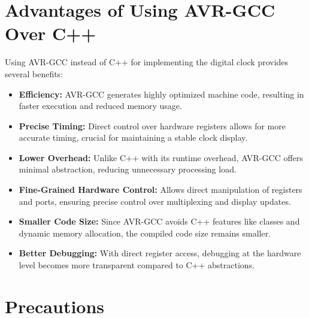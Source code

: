 \documentclass[a4paper,12pt]{article}
\theoremstyle{remark}
\begin{document}
 

\section{Advantages of Using AVR-GCC Over C++}
Using AVR-GCC instead of C++ for implementing the digital clock provides several benefits:

\begin{itemize}
    \item \textbf{Efficiency:} AVR-GCC generates highly optimized machine code, resulting in faster execution and reduced memory usage.
    \item \textbf{Precise Timing:} Direct control over hardware registers allows for more accurate timing, crucial for maintaining a stable clock display.
    \item \textbf{Lower Overhead:} Unlike C++ with its runtime overhead, AVR-GCC offers minimal abstraction, reducing unnecessary processing load.
    \item \textbf{Fine-Grained Hardware Control:} Allows direct manipulation of registers and ports, ensuring precise control over multiplexing and display updates.
    \item \textbf{Smaller Code Size:} Since AVR-GCC avoids C++ features like classes and dynamic memory allocation, the compiled code size remains smaller.
    \item \textbf{Better Debugging:} With direct register access, debugging at the hardware level becomes more transparent compared to C++ abstractions.
\end{itemize}



\section{Precautions}
\end{document}
